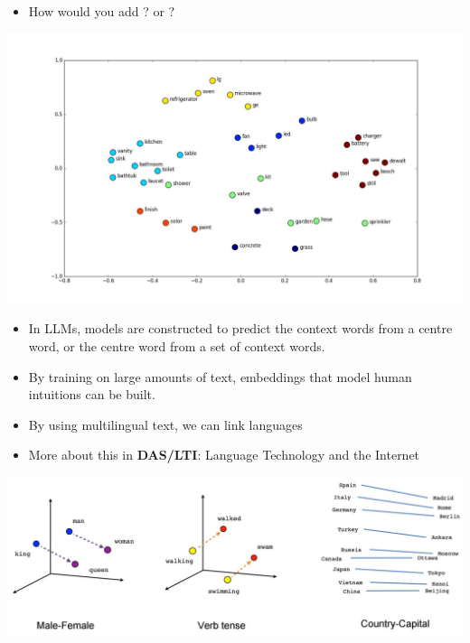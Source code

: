 \documentclass[a4paper,landscape,headrule,footrule,xetex]{foils}
\begin{document}
\begin{itemize}
\item How would you add ? or ?
\end{itemize}



\hspace{-4em}\includegraphics[width=1.1\linewidth]{pics/word-vector-space-similar-words.jpg}


\begin{itemize}
\item In LLMs, models are constructed to predict the context words from a
centre word, or the centre word from a set of context words.
\item By training on large amounts of text, embeddings that model human
intuitions can be built.
\item By using multilingual text, we can link languages
\item More about this in \textbf{DAS/LTI}: Language Technology and the Internet
\end{itemize}


\includegraphics[width=\linewidth]{pics/vocabulary-linear-relationships.jpg}
\end{document}
